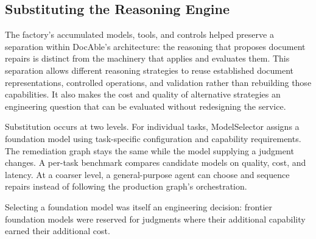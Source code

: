 \subsection{Substituting the Reasoning Engine}\label{heading:exploring-alternative-reasoning-engines}


The factory's accumulated models, tools, and controls helped preserve a separation within DocAble's architecture: the reasoning that proposes document repairs is distinct from the machinery that applies and evaluates them. This separation allows different reasoning strategies to reuse established document representations, controlled operations, and validation rather than rebuilding those capabilities. It also makes the cost and quality of alternative strategies an engineering question that can be evaluated without redesigning the service.

Substitution occurs at two levels. For individual tasks, ModelSelector assigns a foundation model using task-specific configuration and capability requirements. The remediation graph stays the same while the model supplying a judgment changes. A per-task benchmark compares candidate models on quality, cost, and latency. At a coarser level, a general-purpose agent can choose and sequence repairs instead of following the production graph's orchestration.


Selecting a foundation model was itself an engineering decision: frontier foundation models were reserved for judgments where their additional capability earned their additional cost.


